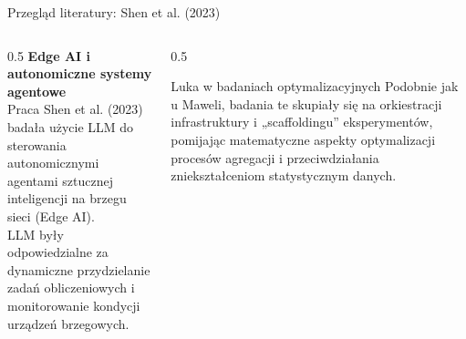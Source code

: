 \documentclass[9pt,aspectratio=169]{beamer}
\begin{document}
\begin{frame}{Przegląd literatury: Shen et al. (2023)}
\begin{columns}[T]
\begin{column}{0.5\textwidth}
\textbf{Edge AI i autonomiczne systemy agentowe}\\[4pt]
Praca Shen et al. (2023) badała użycie LLM do sterowania autonomicznymi agentami sztucznej inteligencji na brzegu sieci (Edge AI).\\[6pt]
LLM były odpowiedzialne za dynamiczne przydzielanie zadań obliczeniowych i monitorowanie kondycji urządzeń brzegowych.
\end{column}
\begin{column}{0.5\textwidth}
\begin{infobox}{Luka w badaniach optymalizacyjnych}
Podobnie jak u Maweli, badania te skupiały się na orkiestracji infrastruktury i „scaffoldingu” eksperymentów, pomijając matematyczne aspekty optymalizacji procesów agregacji i przeciwdziałania zniekształceniom statystycznym danych.
\end{infobox}
\end{column}
\end{columns}
\end{frame}
\end{document}

